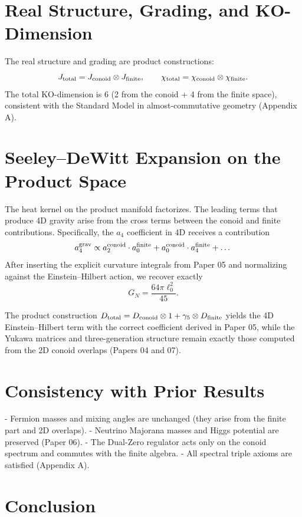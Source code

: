\documentclass[11pt,a4paper]{article}
\begin{document}
\section{Real Structure, Grading, and KO-Dimension}

The real structure and grading are product constructions:
\[
J_{\rm total} = J_{\rm conoid} \otimes J_{\rm finite}, \qquad
\chi_{\rm total} = \chi_{\rm conoid} \otimes \chi_{\rm finite}.
\]
The total KO-dimension is 6 (2 from the conoid + 4 from the finite space), consistent with the Standard Model in almost-commutative geometry (Appendix A).

\section{Seeley--DeWitt Expansion on the Product Space}

The heat kernel on the product manifold factorizes. The leading terms that produce 4D gravity arise from the cross terms between the conoid and finite contributions. Specifically, the \(a_4\) coefficient in 4D receives a contribution
\[
a_4^{\rm grav} \propto a_2^{\rm conoid} \cdot a_0^{\rm finite} + a_0^{\rm conoid} \cdot a_4^{\rm finite} + \dots
\]
After inserting the explicit curvature integrals from Paper 05 and normalizing against the Einstein--Hilbert action, we recover exactly
\[
G_N = \frac{64\pi \ell_0^2}{45}.
\]

\begin{theorem}
The product construction \(D_{\rm total} = D_{\rm conoid} \otimes 1 + \gamma_5 \otimes D_{\rm finite}\) yields the 4D Einstein--Hilbert term with the correct coefficient derived in Paper 05, while the Yukawa matrices and three-generation structure remain exactly those computed from the 2D conoid overlaps (Papers 04 and 07).
\end{theorem}

\section{Consistency with Prior Results}

- Fermion masses and mixing angles are unchanged (they arise from the finite part and 2D overlaps).
- Neutrino Majorana masses and Higgs potential are preserved (Paper 06).
- The Dual-Zero regulator acts only on the conoid spectrum and commutes with the finite algebra.
- All spectral triple axioms are satisfied (Appendix A).

\section{Conclusion}
\end{document}
